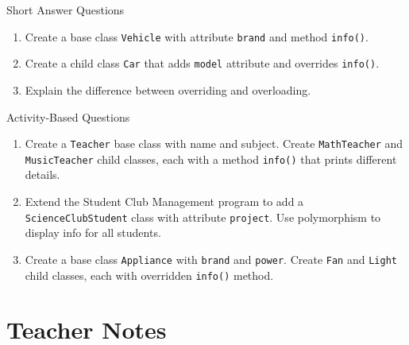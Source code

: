 \begin{exercise}{Short Answer Questions}
\begin{enumerate}
    \item Create a base class \texttt{Vehicle} with attribute \texttt{brand} and method \texttt{info()}.  
    \item Create a child class \texttt{Car} that adds \texttt{model} attribute and overrides \texttt{info()}.  
    \item Explain the difference between overriding and overloading.  
\end{enumerate}
\end{exercise}

\begin{exercise}{Activity-Based Questions}
\begin{enumerate}
    \item Create a \texttt{Teacher} base class with name and subject. Create \texttt{MathTeacher} and \texttt{MusicTeacher} child classes, each with a method \texttt{info()} that prints different details.  
    \item Extend the Student Club Management program to add a \texttt{ScienceClubStudent} class with attribute \texttt{project}. Use polymorphism to display info for all students.  
    \item Create a base class \texttt{Appliance} with \texttt{brand} and \texttt{power}. Create \texttt{Fan} and \texttt{Light} child classes, each with overridden \texttt{info()} method.  
\end{enumerate}
\end{exercise}

\section{Teacher Notes}

